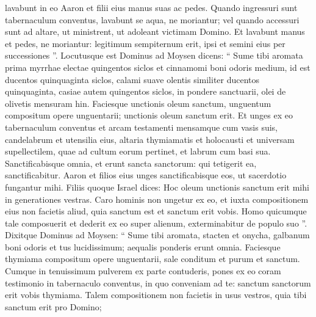 \begin{biblechapter}
\begin{biblechapter}
\begin{biblechapter}
\begin{biblechapter}
\begin{biblechapter}
\begin{biblechapter}
\begin{biblechapter}
\begin{biblechapter}
\begin{biblechapter}
\begin{biblechapter}
\begin{biblechapter}
\begin{biblechapter}
\begin{biblechapter}
\begin{biblechapter}
\begin{biblechapter}
\begin{biblechapter}
\begin{biblechapter}
\begin{biblechapter}
\begin{biblechapter}
\begin{biblechapter}
\begin{biblechapter}
\begin{biblechapter}
\begin{biblechapter}
\begin{biblechapter}
\begin{biblechapter}
\begin{biblechapter}
\begin{biblechapter}
\begin{biblechapter}
\begin{biblechapter}
\begin{biblechapter}
\verse lavabunt in eo Aaron et filii eius manus suas ac pedes. 
 \verse Quando ingressuri sunt tabernaculum conventus, lavabunt se aqua, ne moriantur; vel quando accessuri sunt ad altare, ut ministrent, ut adoleant victimam Domino. 
\verse Et lavabunt manus et pedes, ne moriantur: legitimum sempiternum erit, ipsi et semini eius per successiones ”.
 \verse Locutusque est Dominus ad Moysen 
\verse dicens: “ Sume tibi aromata prima myrrhae electae quingentos siclos et cinnamomi boni odoris medium, id est ducentos quinquaginta siclos, calami suave olentis similiter ducentos quinquaginta, 
\verse casiae autem quingentos siclos, in pondere sanctuarii, olei de olivetis mensuram hin. 
\verse Faciesque unctionis oleum sanctum, unguentum compositum opere unguentarii; unctionis oleum sanctum erit. 
\verse Et unges ex eo tabernaculum conventus et arcam testamenti 
\verse mensamque cum vasis suis, candelabrum et utensilia eius, altaria thymiamatis 
\verse et holocausti et universam supellectilem, quae ad cultum eorum pertinet, et labrum cum basi sua. 
 \verse Sanctificabisque omnia, et erunt sancta sanctorum: qui tetigerit ea, sanctificabitur.
 \verse Aaron et filios eius unges sanctificabisque eos, ut sacerdotio fungantur mihi. 
\verse Filiis quoque Israel dices: Hoc oleum unctionis sanctum erit mihi in generationes vestras. 
\verse Caro hominis non ungetur ex eo, et iuxta compositionem eius non facietis aliud, quia sanctum est et sanctum erit vobis. 
 \verse Homo quicumque tale composuerit et dederit ex eo super alienum, exterminabitur de populo suo ”.
 \verse Dixitque Dominus ad Moysen: “ Sume tibi aromata, stacten et onycha, galbanum boni odoris et tus lucidissimum; aequalis ponderis erunt omnia. 
\verse Faciesque thymiama compositum opere unguentarii, sale conditum et purum et sanctum. 
\verse Cumque in tenuissimum pulverem ex parte contuderis, pones ex eo coram testimonio in tabernaculo conventus, in quo conveniam ad te: sanctum sanctorum erit vobis thymiama. 
\verse Talem compositionem non facietis in usus vestros, quia tibi sanctum erit pro Domino; 

\end{biblechapter}
\end{biblechapter}
\end{biblechapter}
\end{biblechapter}
\end{biblechapter}
\end{biblechapter}
\end{biblechapter}
\end{biblechapter}
\end{biblechapter}
\end{biblechapter}
\end{biblechapter}
\end{biblechapter}
\end{biblechapter}
\end{biblechapter}
\end{biblechapter}
\end{biblechapter}
\end{biblechapter}
\end{biblechapter}
\end{biblechapter}
\end{biblechapter}
\end{biblechapter}
\end{biblechapter}
\end{biblechapter}
\end{biblechapter}
\end{biblechapter}
\end{biblechapter}
\end{biblechapter}
\end{biblechapter}
\end{biblechapter}
\end{biblechapter}
